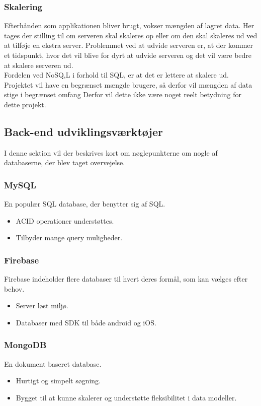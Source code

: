 \subsubsection{Skalering}
Efterhånden som applikationen bliver brugt, vokser mængden af lagret data. Her tages der stilling til om serveren skal skaleres op eller om den skal skaleres ud ved at tilføje en ekstra server. Problemmet ved at udvide serveren er, at der kommer et tidspunkt, hvor det vil blive for dyrt at udvide serveren og det vil være bedre at skalere serveren ud. \\
Fordelen ved NoSQ,L i forhold til SQL, er at det er lettere at skalere ud. 
Projektet vil have en begrænset mængde brugere, så derfor vil mængden af data stige i begrænset omfang
Derfor vil dette ikke være noget reelt betydning for dette projekt.

\subsection{Back-end udviklingsværktøjer}
I denne sektion vil der beskrives kort om nøglepunkterne om nogle af databaserne, der blev taget overvejelse. 

\subsubsection{MySQL\cite{MySQL}}
En populær SQL database, der benytter sig af SQL.
\begin{itemize}[-]
	\item ACID\cite{ACID} operationer understøttes.
	\item Tilbyder mange query muligheder.
\end{itemize}

\subsubsection{Firebase\cite{Firebase}}
Firebase indeholder flere databaser til hvert deres formål, som kan vælges efter behov. 
\begin{itemize}[-]
	\item Server løst miljø.
	\item Databaser med SDK til både android og iOS.
\end{itemize}

\subsubsection{MongoDB\cite{mongoDB}}
En dokument baseret database.
\begin{itemize}[-]
	\item Hurtigt og simpelt søgning.
	\item Bygget til at kunne skalerer og understøtte fleksibilitet i data modeller.  \\
	
\end{itemize}

